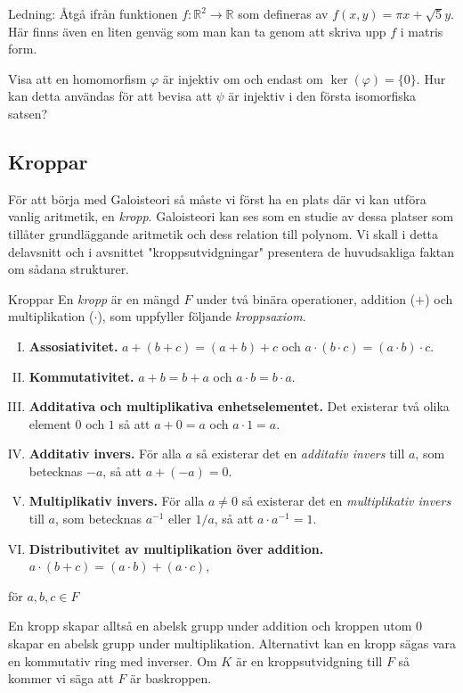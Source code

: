 \documentclass{article}
\theoremstyle{definition}
\begin{document}
Ledning: Åtgå ifrån funktionen $f: \mathbb{R}^2 \rightarrow \mathbb{R}$ som defineras av $f(x, y) = \pi x + \sqrt 5 y$. 
Här finns även en liten genväg som man kan ta genom att skriva upp $f$ i matris form. 

\begin{ovning}{2}
  Visa att en homomorfism $\varphi$ är injektiv om och endast om $\ker(\varphi) = \{0\}.$ Hur kan detta användas för att bevisa att 
  $\psi$ är injektiv i den första isomorfiska satsen?
\end{ovning}

\subsection{Kroppar}
För att börja med Galoisteori så måste vi först ha en plats där vi kan utföra vanlig aritmetik, en \textit{kropp}. Galoisteori kan ses som en studie 
av dessa platser som tillåter grundläggande aritmetik och dess relation till polynom. Vi skall i detta delavsnitt och i avsnittet "kroppsutvidgningar" 
presentera de huvudsakliga faktan om 
sådana strukturer. 


\begin{mydef}{Kroppar}{}
    En \textit{kropp} är en mängd $F$ under två binära operationer, addition ($+$) och multiplikation ($\cdot$), som uppfyller följande \textit{kroppsaxiom}.
    \begin{enumerate}[I)]
        \item \textbf{Assosiativitet.} $a + (b + c) = (a + b) + c$ och $a \cdot (b \cdot c) = (a \cdot b) \cdot c$.
        \item \textbf{Kommutativitet.} $a + b = b + a$ och $a \cdot b = b \cdot a$.
        \item \textbf{Additativa och multiplikativa enhetselementet.} Det existerar två olika element $0$ och $1$ så att $a + 0 = a$ och $a \cdot 1 = a.$
        \item \textbf{Additativ invers.} För alla $a$ så existerar det en \textit{additativ invers} till $a$, som betecknas
        $-a$, så att $a + (-a) = 0$.
        \item \textbf{Multiplikativ invers.} För alla $a \neq 0$ så existerar det en \textit{multiplikativ invers} till $a$, som betecknas $a^{-1}$ eller $1/a$, så att 
        $a \cdot a^{-1} = 1.$
        \item \textbf{Distributivitet av multiplikation över addition.} $a \cdot (b + c) = (a \cdot b) + (a \cdot c)$,
    \end{enumerate}
    för $a, b, c \in F$
\end{mydef}
En kropp skapar alltså en abelsk grupp under addition och kroppen utom $0$ skapar en abelsk grupp under multiplikation. Alternativt kan en kropp sägas
vara en kommutativ ring med inverser. Om $K$ är en kroppsutvidgning till $F$ så kommer vi säga att $F$ är baskroppen. 
\end{document}
